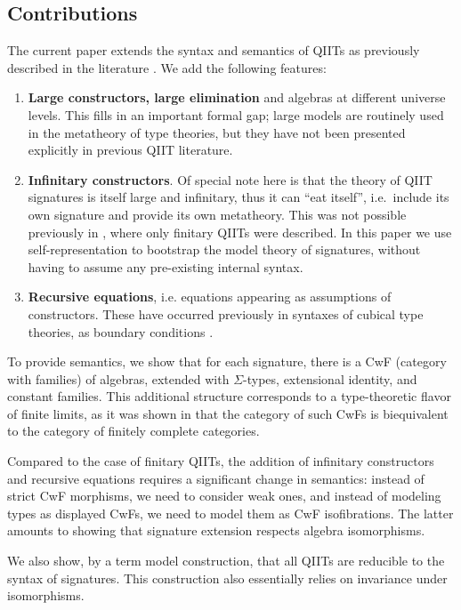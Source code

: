 \documentclass[sigplan,review,anonymous]{acmart}\settopmatter{printfolios=true,printccs=false,printacmref=false}
\begin{document}
\subsection{Contributions}
The current paper extends the syntax and semantics of QIITs as previously described
in the literature \cite{kaposi2019constructing, gabe, dijkstra2017quotient}. We add the following features:
\begin{enumerate}
  \item
  \textbf{Large constructors, large elimination} and algebras at different
  universe levels. This fills in an important formal gap; large models are
  routinely used in the metatheory of type theories, but they have not been
  presented explicitly in previous QIIT literature.
  \item
  \textbf{Infinitary constructors}.
  Of special note here is that the theory of QIIT signatures is itself large and
  infinitary, thus it can ``eat itself'', i.e.\ include its own signature and
  provide its own metatheory. This was not possible previously in
  \cite{kaposi2019constructing}, where only finitary QIITs were described. In
  this paper we use self-representation to bootstrap the model theory of
  signatures, without having to assume any pre-existing internal syntax.
  \item
  \textbf{Recursive equations}, i.e. equations appearing as assumptions
  of constructors. These have occurred previously in syntaxes of cubical type
  theories, as boundary conditions \cite{cohen2016cubical, angiuli2016computational, angiuli2018cartesian}.
\end{enumerate}

To provide semantics, we show that for each signature, there is a CwF (category
with families) of algebras, extended with $\Sigma$-types, extensional identity,
and constant families. This additional structure corresponds to a type-theoretic
flavor of finite limits, as it was shown in \cite{clairambault2014biequivalence}
that the category of such CwFs is biequivalent to the category of finitely
complete categories.

Compared to the case of finitary QIITs, the addition of infinitary constructors
and recursive equations requires a significant change in semantics: instead of
strict CwF morphisms, we need to consider weak ones, and instead of modeling
types as displayed CwFs, we need to model them as CwF isofibrations. The latter
amounts to showing that signature extension respects algebra isomorphisms.

We also show, by a term model construction, that all QIITs are reducible to the
syntax of signatures. This construction also essentially relies on invariance under
isomorphisms.
\end{document}
